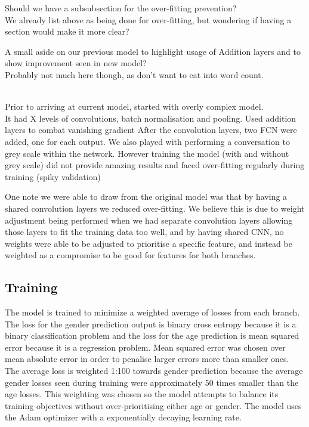 \begin{notes}
    Should we have a subsubsection for the over-fitting prevention?\\
    We already list above as being done for over-fitting, but wondering if having a section would make it more clear?
\end{notes}

\begin{optional}
    \begin{notes}
        A small aside on our previous model to highlight usage of Addition layers and to show improvement seen in new model?\\
        Probably not much here though, as don't want to eat into word count.
    \end{notes}
    \\Prior to arriving at current model, started with overly complex model.\\
    It had X levels of convolutions, batch normalisation and pooling.
    Used addition layers to combat vanishing gradient
    After the convolution layers, two FCN were added, one for each output.
    We also played with performing a conversation to grey scale within the network.
    However training the model (with and without grey scale) did not provide amazing results and faced over-fitting regularly during training (spiky validation)

    One note we were able to draw from the original model was that by having a shared convolution layers we reduced over-fitting.
    We believe this is due to weight adjustment being performed when we had separate convolution layers allowing those layers to fit the training data too well, and by having shared CNN, no weights were able to be adjusted to prioritise a specific feature, and instead be weighted as a compromise to be good for features for both branches.
\end{optional}

\subsection{Training}
The model is trained to minimize a weighted average of losses from each branch. 
The loss for the gender prediction output is binary cross entropy because it is a binary classification problem and the loss for the age prediction is mean squared error because it is a regression problem. 
Mean squared error was chosen over mean absolute error in order to penalise larger errors more than smaller ones. 
The average loss is weighted 1:100 towards gender prediction because the average gender losses seen during training were approximately 50 times smaller than the age losses.
This weighting was chosen so the model attempts to balance its training objectives without over-prioritising either age or gender. 
The model uses the Adam optimizer with a exponentially decaying learning rate. 

